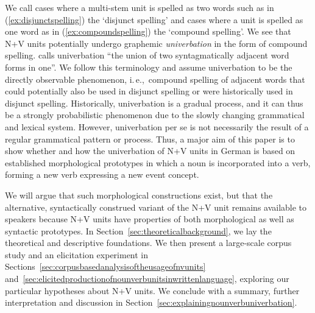 \documentclass[biblatex, charis, linguex]{glossa}\usepackage{knitr}
\newcommand{\ie}{i.\,e.,\ }
\begin{document}
We call cases where a multi-stem unit is spelled as two words such as in (\ref{ex:disjunctspelling}) the `disjunct spelling' and cases where a unit is spelled as one word as in (\ref{ex:compoundspelling}) the `compound spelling'.
We see that N+V units potentially undergo graphemic \textit{univerbation} in the form of compound spelling.
\citet[206]{Lehmann2020} calls univerbation ``the union of two syntagmatically adjacent word forms in one''.
We follow this terminology and assume univerbation to be the directly observable phenomenon, \ie compound spelling of adjacent words that could potentially also be used in disjunct spelling or were historically used in disjunct spelling.
Historically, univerbation is a gradual process, and it can thus be a strongly probabilistic phenomenon due to the slowly changing grammatical and lexical system.
However, univerbation per se is not necessarily the result of a regular grammatical pattern or process.
Thus, a major aim of this paper is to show whether and how the univerbation of N+V units in German is based on established morphological prototypes in which a noun is incorporated into a verb, forming a new verb expressing a new event concept.

We will argue that such morphological constructions exist, but that the alternative, syntactically construed variant of the N+V unit remains available to speakers because N+V units have properties of both morphological as well as syntactic prototypes.
In Section~\ref{sec:theoreticalbackground}, we lay the theoretical and descriptive foundations.
We then present a large-scale corpus study and an elicitation experiment in Sections~\ref{sec:corpusbasedanalysisoftheusageofnvunits} and~\ref{sec:elicitedproductionofnounverbunitsinwrittenlanguage}, exploring our particular hypotheses about N+V units.
We conclude with a summary, further interpretation and discussion in Section~\ref{sec:explainingnounverbuniverbation}.


\end{document}
